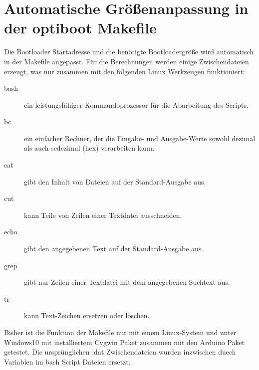 \section{Automatische Größenanpassung in der optiboot Makefile}

Die Bootloader Startadresse und die benötigte Bootloadergröße wird
automatisch in der Makefile angepasst. Für die Berechnungen werden
einige Zwischendateien erzeugt, was nur zusammen
mit den folgenden Linux Werkzeugen funktioniert:
\begin{description}
\item [bash] ein leistungsfähiger Kommandoprozessor für die Abarbeitung des Scripts. 
\item [bc] ein einfacher Rechner, der die Eingabe- und Ausgabe-Werte
sowohl dezimal als auch sedezimal (hex) verarbeiten kann.
\item [cat] gibt den Inhalt von Dateien auf der Standard-Ausgabe aus.
\item [cut] kann Teile von Zeilen einer Textdatei ausschneiden.
\item [echo] gibt den angegebenen Text auf der Standard-Ausgabe aus.
\item [grep] gibt nur Zeilen einer Textdatei mit dem angegebenen Suchtext aus.
\item [tr] kann Text-Zeichen ersetzen oder löschen.
\end{description}

Bisher ist die Funktion der Makefile nur mit einem Linux-System und
unter Windows10 mit installiertem Cygwin Paket zusammen mit den Arduino Paket getestet.
Die ursprünglichen .dat Zwischendateien wurden inzwischen duech Variablen im 
bash Script Dateien ersetzt. 

